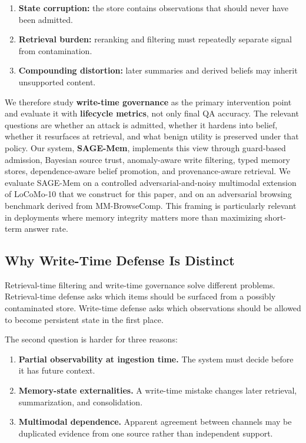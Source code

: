 \documentclass{article}
\begin{document}
\begin{enumerate}
\item \textbf{State corruption:} the store contains observations that should never have been admitted.
\item \textbf{Retrieval burden:} reranking and filtering must repeatedly separate signal from contamination.
\item \textbf{Compounding distortion:} later summaries and derived beliefs may inherit unsupported content.
\end{enumerate}

We therefore study \textbf{write-time governance} as the primary intervention point and evaluate it with \textbf{lifecycle metrics}, not only final QA accuracy. The relevant questions are whether an attack is admitted, whether it hardens into belief, whether it resurfaces at retrieval, and what benign utility is preserved under that policy. Our system, \textbf{SAGE-Mem}, implements this view through guard-based admission, Bayesian source trust, anomaly-aware write filtering, typed memory stores, dependence-aware belief promotion, and provenance-aware retrieval. We evaluate SAGE-Mem on a controlled adversarial-and-noisy multimodal extension of LoCoMo-10 that we construct for this paper, and on an adversarial browsing benchmark derived from MM-BrowseComp. This framing is particularly relevant in deployments where memory integrity matters more than maximizing short-term answer rate.

\subsection{Why Write-Time Defense Is Distinct}

Retrieval-time filtering and write-time governance solve different problems. Retrieval-time defense asks which items should be surfaced from a possibly contaminated store. Write-time defense asks which observations should be allowed to become persistent state in the first place.

The second question is harder for three reasons:

\begin{enumerate}
\item \textbf{Partial observability at ingestion time.} The system must decide before it has future context.
\item \textbf{Memory-state externalities.} A write-time mistake changes later retrieval, summarization, and consolidation.
\item \textbf{Multimodal dependence.} Apparent agreement between channels may be duplicated evidence from one source rather than independent support.
\end{enumerate}
\end{document}
